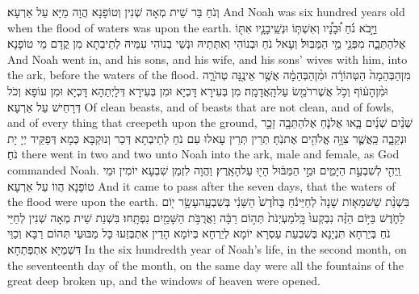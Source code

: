 {וְנֹחַ בַּר שֵׁית מְאָה שְׁנִין וְטוֹפָנָא הֲוָה מַיָּא עַל אַרְעָא׃}
{And Noah was six hundred years old when the flood of waters was upon the earth.}{}
{וַיָּ֣בֹא נֹ֗חַ וּ֠בָנָ֠יו וְאִשְׁתּ֧וֹ וּנְשֵֽׁי\maqqaf בָנָ֛יו אִתּ֖וֹ אֶל\maqqaf הַתֵּבָ֑ה מִפְּנֵ֖י מֵ֥י הַמַּבּֽוּל׃}
{וְעָאל נֹחַ וּבְנוֹהִי וְאִתְּתֵיהּ וּנְשֵׁי בְנוֹהִי עִמֵּיהּ לְתֵיבְתָא מִן קֳדָם מֵי טוֹפָנָא׃}
{And Noah went in, and his sons, and his wife, and his sons’  wives with him, into the ark, before the waters of the flood.}{}
{מִן\maqqaf הַבְּהֵמָה֙ הַטְּהוֹרָ֔ה וּמִ֨ן\maqqaf הַבְּהֵמָ֔ה אֲשֶׁ֥ר אֵינֶ֖נָּה טְהֹרָ֑ה וּמִ֨ן\maqqaf הָע֔וֹף וְכֹ֥ל אֲשֶׁר\maqqaf רֹמֵ֖שׂ עַל\maqqaf הָֽאֲדָמָֽה׃}
{מִן בְּעִירָא דָּכְיָא וּמִן בְּעִירָא דְּלָיְתַהָא דָּכְיָא וּמִן עוֹפָא וְכֹל דְּרָחֵישׁ עַל אַרְעָא׃}
{Of clean beasts, and of beasts that are not clean, and of fowls, and of every thing that creepeth upon the ground,}{}
{שְׁנַ֨יִם שְׁנַ֜יִם בָּ֧אוּ אֶל\maqqaf נֹ֛חַ אֶל\maqqaf הַתֵּבָ֖ה זָכָ֣ר וּנְקֵבָ֑ה כַּֽאֲשֶׁ֛ר צִוָּ֥ה אֱלֹהִ֖ים אֶת\maqqaf נֹֽחַ׃}
{תְּרֵין תְּרֵין עָאלוּ עִם נֹחַ לְתֵיבְתָא דְּכַר וְנוּקְבָּא כְּמָא דְּפַקֵּיד יְיָ יָת נֹחַ׃}
{there went in two and two unto Noah into the ark, male and female, as God commanded Noah.}{}
{וַֽיְהִ֖י לְשִׁבְעַ֣ת הַיָּמִ֑ים וּמֵ֣י הַמַּבּ֔וּל הָי֖וּ עַל\maqqaf הָאָֽרֶץ׃}
{וַהֲוָה לִזְמַן שִׁבְעָא יוֹמִין וּמֵי טוֹפָנָא הֲווֹ עַל אַרְעָא׃}
{And it came to pass after the seven days, that the waters of the flood were upon the earth.}{}
{בִּשְׁנַ֨ת שֵׁשׁ\maqqaf מֵא֤וֹת שָׁנָה֙ לְחַיֵּי\maqqaf נֹ֔חַ בַּחֹ֙דֶשׁ֙ הַשֵּׁנִ֔י בְּשִׁבְעָֽה\maqqaf עָשָׂ֥ר י֖וֹם לַחֹ֑דֶשׁ בַּיּ֣וֹם הַזֶּ֗ה נִבְקְעוּ֙ כׇּֽל\maqqaf מַעְיְנֹת֙ תְּה֣וֹם רַבָּ֔ה וַאֲרֻבֹּ֥ת הַשָּׁמַ֖יִם נִפְתָּֽחוּ׃}
{בִּשְׁנַת שֵׁית מְאָה שְׁנִין לְחַיֵּי נֹחַ בְּיַרְחָא תִּנְיָנָא בְּשִׁבְעַת עַסְרָא יוֹמָא לְיַרְחָא בְּיוֹמָא הָדֵין אִתְבְּזַעוּ כָּל מַבּוּעֵי תְּהוֹם רַבָּא וְכַוֵּי דִּשְׁמַיָּא אִתְפְּתַחָא׃}
{In the six hundredth year of Noah’s life, in the second month, on the seventeenth day of the month, on the same day were all the fountains of the great deep broken up, and the windows of heaven were opened.}{}
